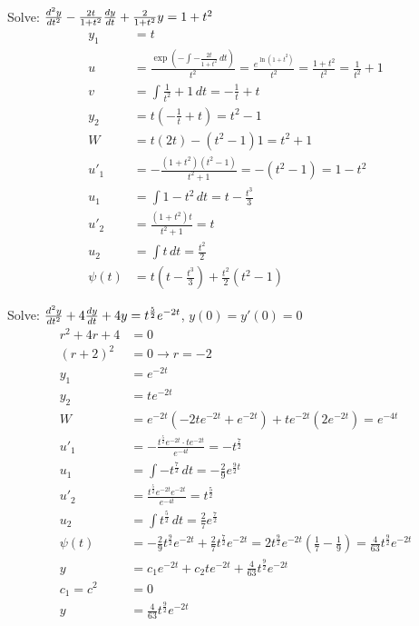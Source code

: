 \documentclass[12pt]{article}
\begin{document}
\begin{example} Solve: $\frac{d^2y}{dt^2} - \frac{2t}{1 + t^2}\frac{dy}{dt}+ \frac{2}{1 + t^2}y = 1 + t^2$ 
$$\begin{aligned} 
y_1 &= t \\ 
u &= \frac{\exp(-\int -\frac{2t}{1 + t^2} \, dt)}{t^2} = \frac{e^{\ln (1 + t^2)}}{t^2} = \frac{1 + t^2}{t^2} = \frac{1}{t^2} + 1 \\ 
v &= \int \frac{1}{t^2} + 1 \, dt = -\frac{1}{t} + t \\ 
y_2 &= t(-\frac{1}{t} + t) = t^2 - 1 \\ 
W &= t(2t) - (t^2 - 1)1 = t^2 + 1 \\ 
u'_1 &= -\frac{(1 + t^2)(t^2 - 1)}{t^2 + 1} = -(t^2 - 1) = 1 - t^2 \\ 
u_1 &= \int 1 - t^2 \, dt = t - \frac{t^3}{3} \\ 
u'_2 &= \frac{(1 + t^2)t}{t^2 + 1} = t \\ 
u_2 &= \int t \, dt = \frac{t^2}{2} \\ 
\psi(t) &= t(t - \frac{t^3}{3}) + \frac{t^2}{2}(t^2 - 1) \end{aligned} $$ \end{example} 

\begin{example} Solve: $\frac{d^2y}{dt^2} + 4\frac{dy}{dt} + 4y = t^{\frac{5}{2}}e^{-2t}$, $y(0) = y'(0) = 0$ $$\begin{aligned} 
r^2 + 4r + 4 &= 0 \\ (r + 2)^2 &= 0 \to r = -2 \\ 
y_1 &= e^{-2t} \\ y_2 &= te^{-2t} \\ W &= e^{-2t}(-2te^{-2t} + e^{-2t}) + te^{-2t}(2e^{-2t}) = e^{-4t} \\ 
u'_1 &= -\frac{t^{\frac{5}{2}}e^{-2t} \cdot te^{-2t}}{e^{-4t}} = -t^{\frac{7}{2}} \\ 
u_1 &= \int -t^{\frac{7}{2}} \, dt = -\frac{2}{9}e^{\frac{9}{2}t} \\
u'_2 &= \frac{t^{\frac{5}{2}}e^{-2t}e^{-2t}}{e^{-4t}} = t^{\frac{5}{2}} \\ 
u_2 &= \int t^{\frac{5}{2}} \, dt = \frac{2}{7}e^{\frac{7}{2}} \\ 
\psi(t) &= -\frac{2}{9}t^{\frac{9}{2}}e^{-2t} + \frac{2}{7}t^{\frac{7}{2}}e^{-2t} = 2t^{\frac{9}{2}}e^{-2t}(\frac{1}{7} - \frac{1}{9}) = \frac{4}{63}t^{\frac{9}{2}}e^{-2t} \\ 
y &= c_1e^{-2t} + c_2te^{-2t} + \frac{4}{63}t^{\frac{9}{2}}e^{-2t} \\ 
c_1 = c^2 &= 0 \\ 
y &= \frac{4}{63}t^{\frac{9}{2}}e^{-2t} \end{aligned} $$ \end{example} 
\end{document}
